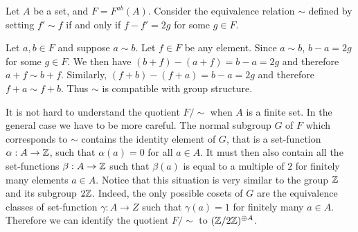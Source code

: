 \begin{solution}
	Let $A$ be a set, and $F = F^{ab}(A)$. Consider the equivalence relation $\sim$ defined by setting $f' \sim f$ if and only if $f - f' = 2g$ for some $g \in F$.
	
	Let $a, b \in F$ and suppose $a \sim b$. Let $f \in F$ be any element. Since $a \sim b$, $b - a = 2g$ for some $g \in F$. We then have $(b + f) - (a + f) = b - a = 2g$ and therefore $a + f \sim b + f$. Similarly, $(f + b) - (f + a) = b - a = 2g$ and therefore $f + a \sim f + b$. Thus $\sim$ is compatible with group structure.
	
	It is not hard to understand the quotient $F/\sim$ when $A$ is a finite set. In the general case we have to be more careful. The normal subgroup $G$ of $F$ which corresponds to $\sim$ contains the identity element of $G$, that is a set-function $\alpha: A \to \mathbb{Z}$, such that $\alpha(a) = 0$ for all $a \in A$. It must then also contain all the set-functions $\beta: A \to \mathbb{Z}$ such that $\beta(a)$ is equal to a multiple of $2$ for finitely many elements $a \in A$. Notice that this situation is very similar to the group $\mathbb{Z}$ and its subgroup $2\mathbb{Z}$. Indeed, the only possible cosets of $G$ are the equivalence classes of set-function $\gamma: A \to Z$ such that $\gamma(a) = 1$ for finitely many $a \in A$. Therefore we can identify the quotient $F/\sim$ to $(\mathbb{Z}/2\mathbb{Z})^{\oplus A}$.
\end{solution}

\begin{problem}
\end{problem}

